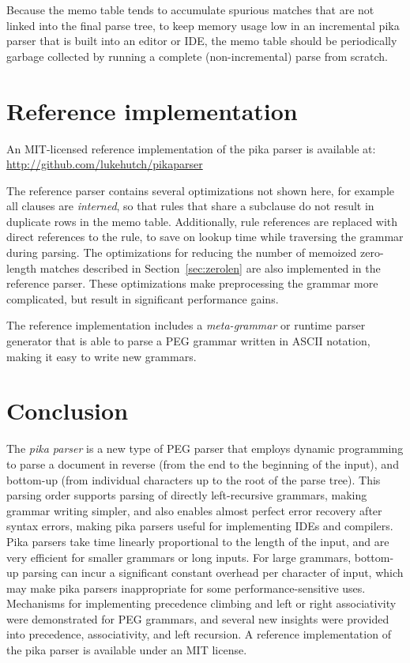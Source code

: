 \documentclass[manuscript,screen]{acmart}
\begin{document}
Because the memo table tends to accumulate spurious matches that are not linked into the final parse tree, to keep memory usage low in an incremental pika parser that is built into an editor or IDE, the memo table should be periodically garbage collected by running a complete (non-incremental) parse from scratch.

\section{\label{sec:software}Reference implementation}

An MIT-licensed reference implementation of the pika parser is available at: \url{http://github.com/lukehutch/pikaparser}

The reference parser contains several optimizations not shown here, for example all clauses are \emph{interned}, so that rules that share a subclause do not result in duplicate rows in the memo table. Additionally, rule references are replaced with direct references to the rule, to save on lookup time while traversing the grammar during parsing. The optimizations for reducing the number of memoized zero-length matches described in Section~\ref{sec:zerolen} are also implemented in the reference parser. These optimizations make preprocessing the grammar more complicated, but result in significant performance gains.

The reference implementation includes a \emph{meta-grammar} or runtime parser generator that is able to parse a PEG grammar written in ASCII notation, making it easy to write new grammars.

\section{Conclusion}

The \emph{pika parser} is a new type of PEG parser that employs dynamic programming to parse a document in reverse (from the end to the beginning of the input), and bottom-up (from individual characters up to the root of the parse tree). This parsing order supports parsing of directly left-recursive grammars, making grammar writing simpler, and also enables almost perfect error recovery after syntax errors, making pika parsers useful for implementing IDEs and compilers. Pika parsers take time linearly proportional to the length of the input, and are very efficient for smaller grammars or long inputs. For large grammars, bottom-up parsing can incur a significant constant overhead per character of input, which may make pika parsers inappropriate for some performance-sensitive uses. Mechanisms for implementing precedence climbing and left or right associativity were demonstrated for PEG grammars, and several new insights were provided into precedence, associativity, and left recursion. A reference implementation of the pika parser is available under an MIT license.
\end{document}
